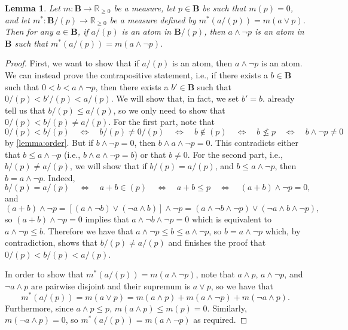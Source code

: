 \documentclass{article}
\newtheorem{lemma}{Lemma}
\theoremstyle{definition}
\theoremstyle{remark}
\begin{document}
\begin{lemma} \label{lemma:measure_of_atom}
  Let $m\colon \mathbf{B} \to \mathbb{R}_{\ge 0}$ be a measure, let $p \in
  \mathbf{B}$ be such that $m(p) = 0$, and let $m^*\colon \mathbf{B}/(p) \to
  \mathbb{R}_{\ge 0}$ be a measure defined by $m^*(a/(p)) = m(a \lor p)$. Then
  for any $a \in \mathbf{B}$, if $a/(p)$ is an atom in $\mathbf{B}/(p)$, then $a
  \land \neg p$ is an atom in $\mathbf{B}$ such that $m^*(a/(p)) = m(a \land
  \neg p)$.
\end{lemma}
\begin{proof} %
  First, we want to show that if $a/(p)$ is an atom, then $a \land \neg p$ is an
  atom. We can instead prove the contrapositive statement, i.e., if there exists
  a $b \in \mathbf{B}$ such that $0 < b < a \land \neg p$, then there exists a
  $b' \in \mathbf{B}$ such that $0/(p) < b'/(p) < a/(p)$. We will show that, in
  fact, we set $b' = b$.
   already tell
  us that $b/(p) \le a/(p)$, so we only need to show that $0/(p) < b/(p) \ne
  a/(p)$. For the first part, note that
  \[
    0/(p) < b/(p) \quad \iff \quad b/(p) \ne 0/(p) \quad \iff \quad b \not\in
    (p) \quad \iff \quad b \not\le p \quad \iff \quad b \land \neg p \ne 0
  \]
  by \cref{lemma:order}. But if $b \land \neg p = 0$, then $b \land a \land \neg
  p = 0$. This contradicts either that $b \le a \land \neg p$ (i.e., $b \land a
  \land \neg p = b$) or that $b \ne 0$. For the second part, i.e., $b/(p) \ne
  a/(p)$, we will show that if $b/(p) = a/(p)$, and $b \le a \land \neg p$, then
  $b = a \land \neg p$. Indeed,
  \[
    b/(p) = a/(p) \quad \iff \quad a + b \in (p) \quad \iff \quad a+b \le p
    \quad \iff \quad (a+b) \land \neg p = 0,
  \]
  and
  \[
    (a+b) \land \neg p = [(a \land \neg b) \lor (\neg a \land b)] \land \neg p =
    (a \land \neg b \land \neg p) \lor (\neg a \land b \land \neg p),
  \]
  so $(a+b) \land \neg p = 0$ implies that $a \land \neg b \land \neg p = 0$
  which is equivalent to $a \land \neg p \le b$. Therefore we have that $a \land
  \neg p \le b \le a \land \neg p$, so $b = a \land \neg p$ which, by
  contradiction, shows that $b/(p) \ne a/(p)$ and finishes the proof that $0/(p)
  < b/(p) < a/(p)$.

  In order to show that $m^*(a/(p)) = m(a \land \neg p)$, note that $a \land p$,
  $a \land \neg p$, and $\neg a \land p$ are pairwise disjoint and their
  supremum is $a \lor p$, so we have that
  \[
    m^*(a/(p)) = m(a \lor p) =  m(a \land p) + m(a \land \neg p) + m(\neg a
    \land p).
  \]
  Furthermore, since $a \land p \le p$, $m(a \land p) \le m(p) = 0$. Similarly,
  $m(\neg a \land p) = 0$, so $m^*(a/(p)) = m(a \land \neg p)$ as required.
\end{proof}
\end{document}
